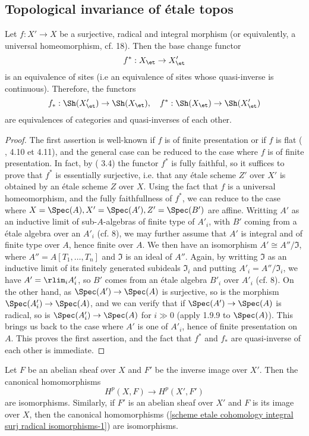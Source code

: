 \subsection{Topological invariance of \'etale topos}
\begin{theorem}\label{scheme etale site equivalence if integral surj radical}
Let $f:X'\to X$ be a surjective, radical and integral morphism (or equivalently, a universal homeomorphism, cf. \cite{EGA4} 18). Then the base change functor
\[f^*:X_\et\to X'_\et\]
is an equivalence of sites (i.e an equivalence of sites whose quasi-inverse is continuous). Therefore, the functors
\[f_*:\Sh(X'_\et)\to\Sh(X_\et),\quad f^*:\Sh(X_\et)\to\Sh(X'_\et)\] 
are equivalences of categories and quasi-inverses of each other.
\end{theorem}
\begin{proof}
The first assertion is well-known if $f$ is of finite presentation or if $f$ is flat (\cite{SGA1} , 4.10 et 4.11), and the general case can be reduced to the case where $f$ is of finite presentation. In fact, by (\cite{SGA1}  3.4) the functor $f^*$ is fully faithful, so it suffices to prove that $f^*$ is essentially surjective, i.e. that any \'etale scheme $Z'$ over $X'$ is obtained by an \'etale scheme $Z$ over $X$. Using the fact that $f$ is a universal homeomorphism, and the fully faithfullness of $f^*$, we can reduce to the case where $X=\Spec(A),X'=\Spec(A'),Z'=\Spec(B')$ are affine. Writting $A'$ as an inductive limit of sub-$A$-algebras of finite type of $A'_i$, with $B'$ coming from a \'etale algebra over an $A'_i$ (cf. \cite{EGA4} 8), we may further assume that $A'$ is integral and of finite type over $A$, hence finite over $A$. We then have an isomorphism $A'\cong A''/\mathfrak{I}$, where $A''=A[T_1,\dots,T_n]$ and $\mathfrak{I}$ is an ideal of $A''$. Again, by writting $\mathfrak{I}$ as an inductive limit of its finitely generated subideals $\mathfrak{I}_i$ and putting $A'_i=A''/\mathfrak{I}_i$, we have $A'=\rlim_iA'_i$, so $B'$ comes from an \'etale algebra $B'_i$ over $A'_i$ (cf. \cite{EGA4} 8). On the other hand, as $\Spec(A')\to\Spec(A)$ is surjective, so is the morphism $\Spec(A'_i)\to\Spec(A)$, and we can verify that if $\Spec(A')\to\Spec(A)$ is radical, so is $\Spec(A'_i)\to\Spec(A)$ for $i\gg 0$ (apply \cite{EGA4} 1.9.9 to $\Spec(A)$). This brings us back to the case where $A'$ is one of $A'_i$, hence of finite presentation on $A$. This proves the first assertion, and the fact that $f^*$ and $f_*$ are quasi-inverse of each other is immediate.
\end{proof}
\begin{corollary}\label{scheme etale cohomology integral surj radical isomorphisms}
Let $F$ be an abelian sheaf over $X$ and $F'$ be the inverse image over $X'$. Then the canonical homomorphisms
\begin{equation}\label{scheme etale cohomology integral surj radical isomorphisms-1}
H^p(X,F)\to H^p(X',F')
\end{equation}
are isomorphisms. Similarly, if $F'$ is an abelian sheaf over $X'$ and $F$ is its image over $X$, then the canonical homomorphisms (\ref{scheme etale cohomology integral surj radical isomorphisms-1}) are isomorphisms.
\end{corollary}

